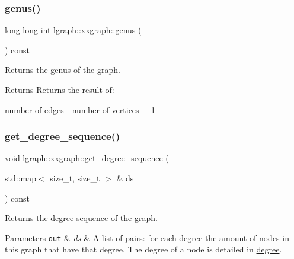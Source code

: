 \subsubsection{\texorpdfstring{genus()}{genus()}}
{\footnotesize\ttfamily long long int lgraph\+::xxgraph\+::genus (\begin{DoxyParamCaption}{ }\end{DoxyParamCaption}) const\hspace{0.3cm}{\ttfamily [inherited]}}



Returns the genus of the graph. 

\begin{DoxyReturn}{Returns}
Returns the result of\+: \begin{DoxyVerb}number of edges - number of vertices + 1
\end{DoxyVerb}
 
\end{DoxyReturn}
\mbox{\label{classlgraph_1_1xxgraph_a5b21b51f5f9c55c05c0e8e5bc836bf87}} 
\subsubsection{\texorpdfstring{get\+\_\+degree\+\_\+sequence()}{get\_degree\_sequence()}}
{\footnotesize\ttfamily void lgraph\+::xxgraph\+::get\+\_\+degree\+\_\+sequence (\begin{DoxyParamCaption}\item[{std\+::map$<$ size\+\_\+t, size\+\_\+t $>$ \&}]{ds }\end{DoxyParamCaption}) const\hspace{0.3cm}{\ttfamily [inherited]}}



Returns the degree sequence of the graph. 


\begin{DoxyParams}[1]{Parameters}
\mbox{\tt out}  & {\em ds} & A list of pairs\+: for each degree the amount of nodes in this graph that have that degree. The degree of a node is detailed in \hyperlink{classlgraph_1_1xxgraph_a20ebc2927ee8fb8bb0a2c3b448d9ed78}{degree}. \\
\hline
\end{DoxyParams}
\mbox{\label{classlgraph_1_1xxgraph_abb0c474cb162940aba3439124c1202d7}} 
